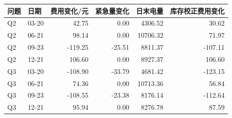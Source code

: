 \begin{tabular}{llrrrr}
\toprule
问题 & 日期 & 费用变化/元 & 紧急量变化 & 日末电量 & 库存校正费用变化 \\
\midrule
Q2 & 03-20 & 42.75 & 0.00 & 4306.52 & 30.62 \\
Q2 & 06-21 & 98.14 & 0.00 & 10706.32 & 71.97 \\
Q2 & 09-23 & -119.25 & -25.51 & 8811.37 & -107.11 \\
Q2 & 12-21 & 106.60 & 0.00 & 8927.37 & 106.60 \\
Q3 & 03-20 & -108.90 & -33.79 & 4681.42 & -123.15 \\
Q3 & 06-21 & 74.36 & 0.00 & 10713.36 & 56.84 \\
Q3 & 09-23 & -108.55 & -23.38 & 8176.14 & -112.64 \\
Q3 & 12-21 & 95.94 & 0.00 & 8276.78 & 87.59 \\
\bottomrule
\end{tabular}
